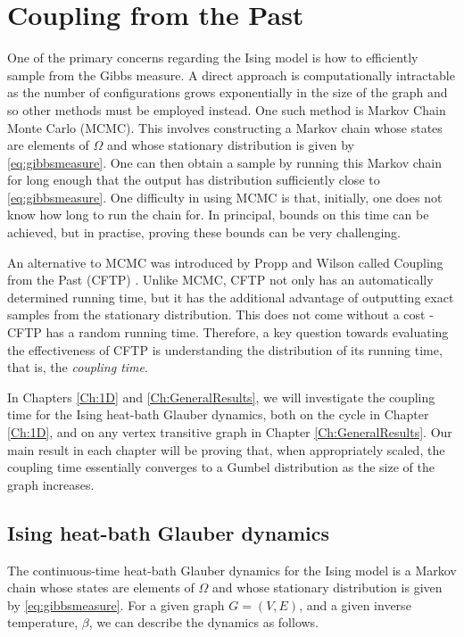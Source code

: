 \section{Coupling from the Past}
	One of the primary concerns regarding the Ising model is how to efficiently sample from the Gibbs measure. A direct approach is computationally intractable as the number of configurations grows exponentially in the size of the graph and so other methods must be employed instead. One such method is Markov Chain Monte Carlo (MCMC). This involves constructing a Markov chain whose states are elements of $\Omega$ and whose stationary distribution is given by \eqref{eq:gibbsmeasure}. One can then obtain a sample by running this Markov chain for long enough that the output has distribution sufficiently close to \eqref{eq:gibbsmeasure}.
	One difficulty in using MCMC is that, initially, one does not know how long to run the chain for. In principal, bounds on this time can be achieved, but in practise, proving these bounds can be very challenging.

	An alternative to MCMC was introduced by Propp and Wilson called Coupling from the Past (CFTP) \cite{Propp1996-cf}. Unlike MCMC, CFTP not only has an automatically determined running time, but it has the additional advantage of outputting exact samples from the stationary distribution. This does not come without a cost - CFTP has a random running time. Therefore, a key question towards evaluating the effectiveness of CFTP is understanding the distribution of its running time, that is, the \emph{coupling time}.

	In Chapters \ref{Ch:1D} and \ref{Ch:GeneralResults}, we will investigate the coupling time for the Ising heat-bath Glauber dynamics, both on the cycle in Chapter \ref{Ch:1D}, and on any vertex transitive graph in Chapter \ref{Ch:GeneralResults}. Our main result in each chapter will be proving that, when appropriately scaled, the coupling time essentially converges to a Gumbel distribution as the size of the graph increases. 

	\subsection{Ising heat-bath Glauber dynamics}
	\label{sec:heat-bath glauber dynamics definition}
	The continuous-time heat-bath Glauber dynamics for the Ising model is a Markov chain whose states are elements of $\Omega$ and whose stationary distribution is given by \eqref{eq:gibbsmeasure}. For a given graph $G = (V, E)$, and a given inverse temperature, $\beta$, we can describe the dynamics as follows. 

